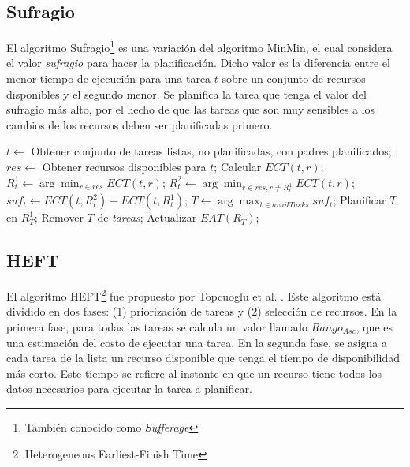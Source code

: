 \subsection{Sufragio}
\label{alg:sufferage}
El algoritmo Sufragio\footnote{También conocido como \emph{Sufferage}} \cite{maheswaran1999dynamic} es una variación del algoritmo MinMin, el cual considera el valor \emph{sufragio} para hacer la planificación. Dicho valor es la diferencia entre el menor tiempo de ejecución para una tarea $t$ sobre un conjunto de recursos disponibles y el segundo menor. Se planifica la tarea que tenga el valor del sufragio más alto, por el hecho de que las tareas que son muy sensibles a los cambios de los recursos deben ser planificadas primero. 
\\
\begin{algorithmic}[1]
	\State $t \gets$ Obtener conjunto de tareas listas, no planificadas, con padres planificados;
	\State {};
\EndWhile
{}
			\State $res \gets$ Obtener recursos disponibles para $t$;
				\State Calcular $ECT(t,r)$;
			\EndFor
			\State $R^1_t \gets \arg\min_{r \in res}ECT(t,r)$;
			\State $R^2_t \gets \arg\min_{r \in res, r \ne{R^1_t}}ECT(t,r)$;
			\State $suf_t \gets ECT(t,R^2_t) - ECT(t,R^1_t)$;
		\EndFor
		\State $T \gets \arg\max_{t \in availTasks}suf_t$;
		\State Planificar $T$ en $R^1_T$;
		\State Remover $T$ de \emph{tareas};
		\State Actualizar $EAT(R_T)$;
	\EndWhile
\EndProcedure
\end{algorithmic}

\subsection{HEFT}
\label{alg:heft}
El algoritmo HEFT\footnote{Heterogeneous Earliest-Finish Time} fue propuesto por Topcuoglu et al. \cite{topcuoglu2002performance}. Este algoritmo está dividido en dos fases: (1) priorización de tareas y (2) selección de recursos. En la primera fase, para todas las tareas se calcula un valor llamado $Rango_{Asc}$, que es una estimación del costo de ejecutar una tarea. En la segunda fase, se asigna a cada tarea de la lista un recurso disponible que tenga el tiempo de disponibilidad más corto. Este tiempo se refiere al instante en que un recurso tiene todos los datos necesarios para ejecutar la tarea a planificar.


